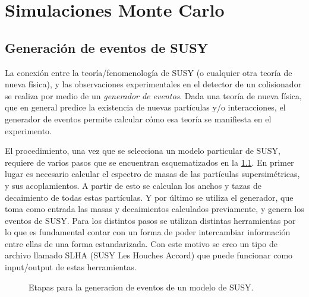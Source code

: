 \chapter{Simulaciones Monte Carlo}


\newcommand{\mccaption}{La sección eficaz a LO para cada modo de decaimiento,
  los factores $k$ (para la normalización NLO) y las eficiencias del filtro
  están detalladas, así como también la luminosidad integrada correspondiente
  a la estadística total de cada muestra.}


\section{Generación de eventos de SUSY}

La conexión entre la teoría/fenomenología de SUSY (o cualquier otra teoría de
nueva física), y las observaciones experimentales en el detector de un
colisionador se realiza por medio de un \emph{generador de eventos}. Dada una
teoría de nueva física, que en general predice la existencia de nuevas
partículas y/o interacciones, el generador de eventos permite calcular cómo esa
teoría se manifiesta en el experimento.

El procedimiento, una vez que se selecciona un modelo particular de SUSY,
requiere de varios pasos que se encuentran esquematizados en la
\cref{fig:mc_sketch}.
En primer lugar es necesario calcular el espectro de masas de las partículas
supersimétricas, y sus acoplamientos. A partir de esto se calculan los anchos y
tazas de decaimiento de todas estas partículas. Y por último se utiliza el
generador, que toma como entrada las masas y decaimientos calculados previamente,
y genera los eventos de SUSY. Para los distintos pasos se utilizan
distintas herramientas por lo que es fundamental contar con un forma de poder
intercambiar información entre ellas de una forma estandarizada. Con este motivo
se creo un tipo de archivo llamado SLHA (SUSY Les Houches Accord)\cite{SLHA} que
puede funcionar como input/output de estas herramientas.

\begin{figure}[h]
  \centering
  \scalebox{0.8}{}
  \caption{Etapas para la generacion de eventos de un modelo de SUSY.}
  \label{fig:mc_sketch}
\end{figure}




